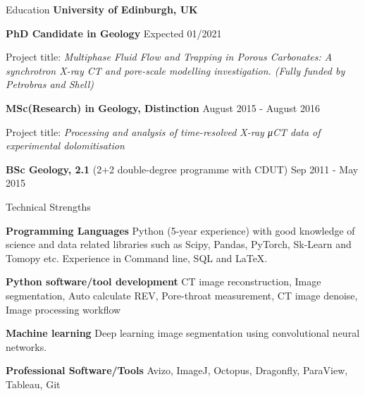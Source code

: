 \documentclass{resume} %
\newenvironment{indentpar}[1]%
  {\begin{list}{}%
          {\setlength{\leftmargin}{#1}}%
          \item[]%
  }
  {\end{list}}
\begin{document}
\begin{rSection}{Education}
{\bf University of Edinburgh, UK} 
\begin{indentpar}{0.5cm}

\textbf{PhD Candidate in Geology} \hfill {Expected 01/2021}
\begin{indentpar}{0.5cm}
Project title: \textit{Multiphase Fluid Flow and Trapping in Porous Carbonates: A synchrotron X-ray CT and pore-scale modelling investigation. (Fully funded by Petrobras and Shell)}
\end{indentpar}
\textbf{MSc(Research) in Geology, Distinction} \hfill {August 2015 - August 2016} 
\begin{indentpar}{0.5cm}
Project title: \textit {Processing and analysis of time-resolved X-ray μCT data of experimental dolomitisation}
\end{indentpar}
\textbf{BSc Geology, 2.1} (2+2 double-degree programme with CDUT) \hfill {Sep 2011 - May 2015} 
\end{indentpar}
\end{rSection}
\begin{rSection}{Technical Strengths}

\begin{indentpar}{0.5cm}
\textbf{Programming Languages} Python (5-year experience) with good knowledge of science and data related libraries such as Scipy, Pandas, PyTorch, Sk-Learn and Tomopy etc. Experience in Command line, SQL and LaTeX.

\textbf{Python software/tool development} CT image reconstruction, Image segmentation, Auto calculate REV, Pore-throat measurement, CT image denoise, Image processing workflow

\textbf{Machine learning} Deep learning image segmentation using convolutional neural networks.

\textbf{Professional Software/Tools} Avizo, ImageJ, Octopus, Dragonfly, ParaView, Tableau, Git

\end{indentpar}
\end{rSection}
\end{document}
